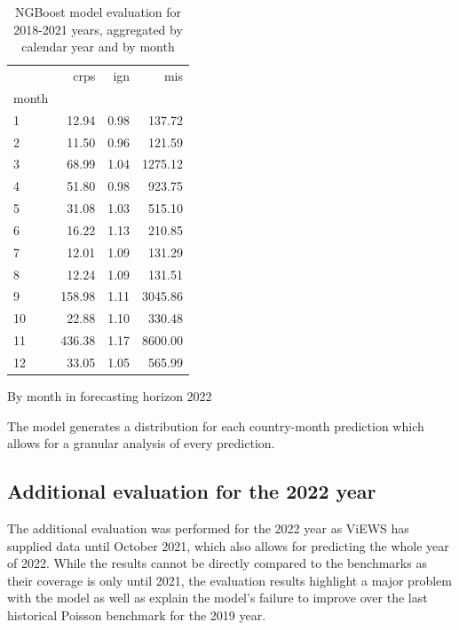 \documentclass[runningheads]{llncs}
\begin{document}
\begin{table}[!htb]
        \begin{subtable}{.3\linewidth}
            \centering

            \begin{tabular}{lrrr}
                \toprule
                & crps   & ign  & mis     \\
                month &        &      &         \\
                \midrule
                1     & 12.94  & 0.98 & 137.72  \\
                2     & 11.50  & 0.96 & 121.59  \\
                3     & 68.99  & 1.04 & 1275.12 \\
                4     & 51.80  & 0.98 & 923.75  \\
                5     & 31.08  & 1.03 & 515.10  \\
                6     & 16.22  & 1.13 & 210.85  \\
                7     & 12.01  & 1.09 & 131.29  \\
                8     & 12.24  & 1.09 & 131.51  \\
                9     & 158.98 & 1.11 & 3045.86 \\
                10    & 22.88  & 1.10 & 330.48  \\
                11    & 436.38 & 1.17 & 8600.00 \\
                12    & 33.05  & 1.05 & 565.99  \\
                \bottomrule
            \end{tabular}

            \caption{By month in forecasting horizon 2022}
            \label{tab:ngboost_b}
        \end{subtable}
        \caption{NGBoost model evaluation for 2018-2021 years, aggregated by calendar year and by month}
    \end{table}

    The model generates a distribution for each country-month prediction which allows for a granular analysis of every prediction.






    \subsection{Additional evaluation for the 2022 year}
    The additional evaluation was performed for the 2022 year as ViEWS has supplied data until October 2021, which also
    allows for predicting the whole year of 2022.
    While the results cannot be directly compared to the benchmarks as their
    coverage is only until 2021, the evaluation results highlight a major problem with the model as well as explain the model's
    failure to improve over the last historical Poisson benchmark for the 2019 year.
\end{document}
